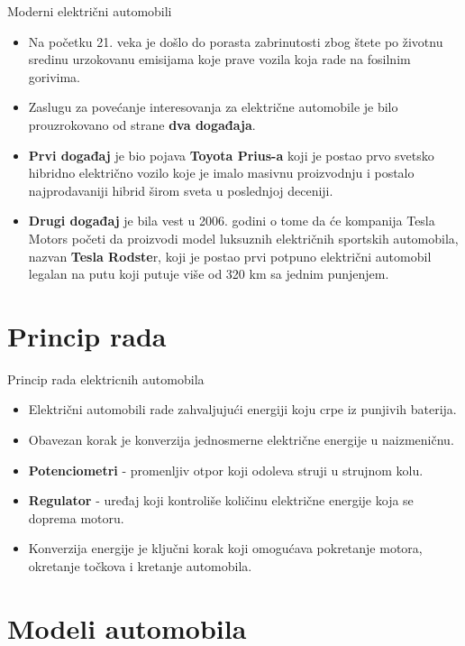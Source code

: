 \documentclass[11pt]{beamer}
\begin{document}
\begin{frame}{Moderni električni automobili}
\begin{itemize}
    \item Na početku 21. veka je došlo do porasta zabrinutosti zbog štete po životnu sredinu urzokovanu emisijama koje prave vozila koja rade na fosilnim gorivima.
    \item Zaslugu za povećanje interesovanja za električne automobile je bilo prouzrokovano od strane \textbf{dva događaja}.
    \item \textbf{Prvi događaj} je bio pojava \textbf{Toyota Prius-a} koji je postao prvo svetsko hibridno električno vozilo koje je imalo masivnu proizvodnju i postalo najprodavaniji hibrid širom sveta u poslednjoj deceniji.
    \item \textbf{Drugi događaj} je bila vest u 2006. godini o tome da će kompanija Tesla Motors početi da proizvodi model luksuznih električnih sportskih automobila, nazvan \textbf{Tesla Rodste}r, koji je postao prvi potpuno električni automobil legalan na putu koji putuje više od 320 km sa jednim punjenjem.
\end{itemize}
\end{frame}

\section{Princip rada}
\begin{frame}{Princip rada elektricnih automobila}
\begin{itemize}
\item Električni automobili rade zahvaljujući energiji koju crpe iz punjivih baterija.
\item Obavezan korak je konverzija jednosmerne električne energije u naizmeničnu.
\item \textbf{Potenciometri} - promenljiv otpor koji odoleva struji u strujnom kolu.
\item \textbf{Regulator} - uređaj koji kontroliše količinu električne energije koja se doprema motoru.
\item Konverzija energije je ključni korak koji omogućava pokretanje motora, okretanje točkova i kretanje automobila.
\end{itemize}
\end{frame}

\section{Modeli automobila}
\end{document}
